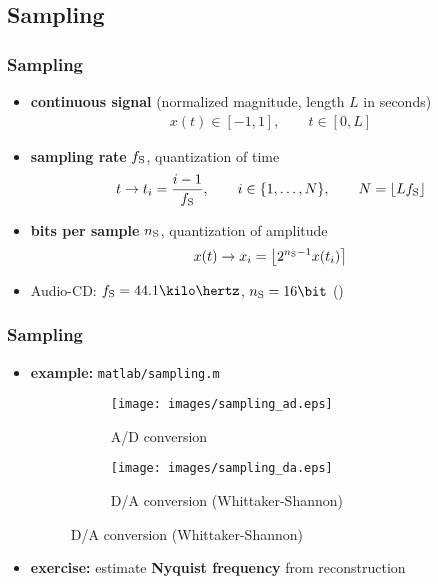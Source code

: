 
\subsection{Sampling}

\begin{frame}
	\frametitle{Sampling}
	\begin{itemize}
		\item \textbf{continuous signal} (normalized magnitude, length $L$ in seconds)
			\begin{align*}
				x(t)\in[-1,1],\qquad t\in[0,L]
			\end{align*}
		\item \textbf{sampling rate} $f_{\textrm S}$, quantization of time
			\begin{align*}
				t\rightarrow t_i=\frac{i-1}{f_{\textrm S}},\qquad i\in\{1,\ldots,N\},\qquad N=\lfloor Lf_{\textrm S}\rfloor
			\end{align*}
		\item \textbf{bits per sample} $n_{\textrm S}$, quantization of amplitude
			\begin{align*}
				x(t)\rightarrow x_i=\left\lfloor2^{n_{\textrm S}-1}x(t_i)\right\rceil
			\end{align*}
		\item Audio-CD: $f_{\textrm S}=44.1\kilo\hertz$, $n_{\textrm S}=16\bit$ ()
	\end{itemize}
\end{frame}

\begin{frame}
	\frametitle{Sampling}
	\begin{itemize}
		\item \textbf{example:} \texttt{matlab/sampling.m}
			\begin{figure}
				\centering
				\begin{subfigure}[t]{0.45\linewidth}
					\texttt{[image: images/sampling\_ad.eps]}
					\caption{A/D conversion}
				\end{subfigure}
				\begin{subfigure}[t]{0.45\linewidth}
					\texttt{[image: images/sampling\_da.eps]}
					\caption{D/A conversion (Whittaker-Shannon)}
				\end{subfigure}
			\end{figure}
		\item \textbf{exercise:} estimate \textbf{Nyquist frequency} from reconstruction
	\end{itemize}
\end{frame}

